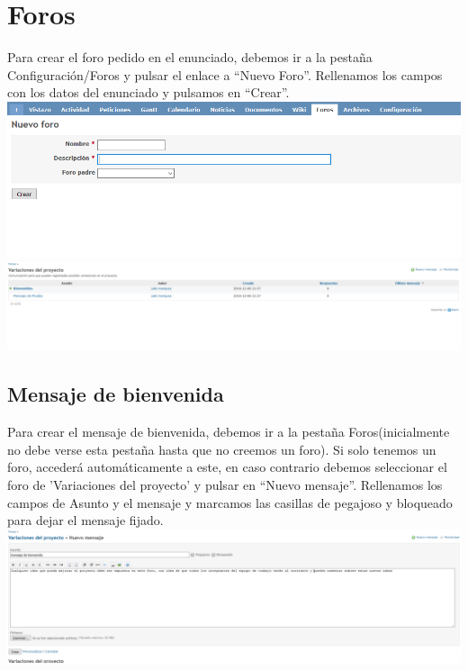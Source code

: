 \documentclass[a4paper,10pt]{scrartcl}
\begin{document}
\section{Foros}

Para crear el foro pedido en el enunciado, debemos ir a la pestaña Configuración/Foros y pulsar el enlace a ``Nuevo Foro''. Rellenamos los campos con los datos del enunciado y pulsamos en ``Crear''.\\

\includegraphics[width=\linewidth]{NuevoForo}\\

\includegraphics[width=\linewidth]{Foros}

\subsection{Mensaje de bienvenida}

Para crear el mensaje de bienvenida, debemos ir a la pestaña Foros(inicialmente no debe verse esta pestaña hasta que no creemos un foro). Si solo tenemos un foro, accederá automáticamente a este, en caso contrario debemos seleccionar el foro de 'Variaciones del proyecto' y pulsar en ``Nuevo mensaje''. Rellenamos los campos de Asunto y el mensaje y marcamos las casillas de pegajoso y bloqueado para dejar el mensaje fijado.
\\

\includegraphics[width=\linewidth]{NuevoMensaje}
\end{document}

